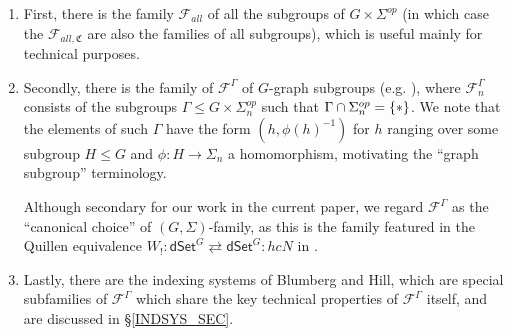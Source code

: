 \documentclass[a4paper,10pt
]{article}%
\numberwithin{equation}{section}
\numberwithin{figure}{section}
\theoremstyle{definition} %
\newcommand{\F}{\ensuremath{\mathcal F}}
\newcommand{\1}{\ensuremath{\mathbbm 1}}%
\begin{document}
\begin{enumerate}[label = (\alph*)]
	\item First, there is the family $\F_{all}$ of all the subgroups of $G \times \Sigma^{op}$
	(in which case the $\F_{all,\mathfrak{C}}$ are also the families of all subgroups), which is useful mainly for technical purposes.
	
	\item Secondly, there is the family of $\F^{\Gamma}$
	of $G$-graph subgroups (e.g. \cite[Def. 6.36]{BP21}),
	where $\F^{\Gamma}_n$ consists of the subgroups
	$\Gamma \leq G \times \Sigma_n^{op}$
	such that $\Gamma \cap \Sigma_n^{op} = \{\**\}$.
	We note that the elements of such $\Gamma$
	have the form $(h,\phi(h)^{-1})$
	for $h$ ranging over some subgroup $H \leq G$
	and $\phi \colon H \to \Sigma_n$
	a homomorphism,
	motivating the ``graph subgroup'' terminology.
	
	Although secondary for our work in the current paper, we regard $\F^{\Gamma}$ as the ``canonical choice'' of
	$(G,\Sigma)$-family, 
	as this is the family featured in the Quillen equivalence
	$W_! \colon 
	\mathsf{dSet}^G \rightleftarrows 
	\mathsf{dSet}^G \colon hcN$
	in \cite[Thm. I]{BP_TAS}.
	
	\item Lastly, there are the indexing systems of Blumberg and Hill,
	which are special subfamilies of $\F^{\Gamma}$
	which share the key technical properties of 
	$\F^{\Gamma}$ itself,
	and are discussed in \S \ref{INDSYS_SEC}.
\end{enumerate}
\end{document}

